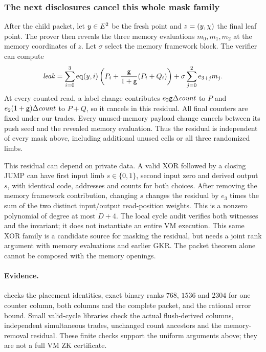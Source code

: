 \subsubsection{The next disclosures cancel this whole mask family}

After the child packet, let $y\in E^2$ be the fresh point and $z=(y,\chi)$ the final leaf point. The prover then reveals the three memory evaluations $m_0,m_1,m_2$ at the memory coordinates of $z$. Let $\sigma$ select the memory framework block. The verifier can compute
\[
 \mathit{leak}=\sum_{i=0}^3\operatorname{eq}(y,i)
       \left(P_i+\frac{\mathsf{g}}{1+\mathsf{g}}(P_i+Q_i)\right)
       +\sigma\sum_{j=0}^2e_{3+j}m_j.
\]
At every counted read, a label change contributes $e_2\mathsf{g}\Delta\mathit{count}$ to $P$ and $e_2(1+\mathsf{g})\Delta\mathit{count}$ to $P+Q$, so it cancels in this residual. All final counters are fixed under our trades. Every unused-memory payload change cancels between its push seed and the revealed memory evaluation. Thus the residual is independent of every mask above, including additional unused cells or all three randomized limbs.

This residual can depend on private data. A valid XOR followed by a closing JUMP can have first input limb $s\in\{0,1\}$, second input zero and derived output $s$, with identical code, addresses and counts for both choices. After removing the memory framework contribution, changing $s$ changes the residual by $e_3$ times the sum of the two distinct input/output read-position weights. This is a nonzero polynomial of degree at most $D+4$. The local cycle audit verifies both witnesses and the invariant; it does not instantiate an entire VM execution. This same XOR family is a candidate source for masking the residual, but needs a joint rank argument with memory evaluations and earlier GKR. The packet theorem alone cannot be composed with the memory openings.

\paragraph{Evidence.}  checks the placement identities, exact binary ranks $768$, $1536$ and $2304$ for one counter column, both columns and the complete packet, and the rational error bound. Small valid-cycle libraries check the actual flush-derived columns, independent simultaneous trades, unchanged count ancestors and the memory-removal residual. These finite checks support the uniform arguments above; they are not a full VM ZK certificate.
